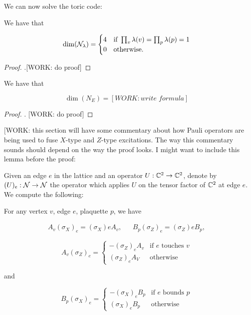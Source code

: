 We can now solve the toric code:

\begin{proposition} We have that

\begin{equation*}
\dim(\mathcal{N}_{\lambda}) = 
\begin{cases}
4 & \text{if }\prod_{v}\lambda(v) = \prod_{p}\lambda(p) = 1\\
0 & \text{otherwise.}
\end{cases}
\end{equation*}

\end{proposition}
\begin{proof}.[WORK: do proof]
\end{proof}

\begin{corollary} We have that

$$\dim (N_{E})=[WORK: write\,\, formula]$$
\end{corollary}
\begin{proof} . [WORK: do proof]
\end{proof}

[WORK: this section will have some commentary about how Pauli operators are being used to fuse $X$-type and $Z$-type excitations. The way this commentary sounds should depend on the way the proof looks. I might want to include this lemma before the proof:

Given an edge $e$ in the lattice and an operator $U:\mathbb{C}^2\to \mathbb{C}^2$, denote by $(U)_e:\mathcal{N}\to\mathcal{N}$ the operator which applies $U$ on the tensor factor of $\mathbb{C}^2$ at edge $e$. We compute the following:

\begin{lemma} For any vertex $v$, edge $e$, plaquette $p$, we have

\begin{align*}
A_v  (\sigma_X)_e=(\sigma_X)e A_v, && B_p (\sigma_Z)_e=(\sigma_Z)e B_p,
\end{align*}

\begin{equation*}
A_v (\sigma_Z)_e=
\begin{cases}
- (\sigma_Z)_e A_v & \text{if $e$ touches $v$}\\
(\sigma_Z)_e A_V & \text{otherwise}
\end{cases}
\end{equation*}

and

\begin{equation*}
B_p (\sigma_X)_e=
\begin{cases}
- (\sigma_X)_e B_p & \text{if $e$ bounds $p$}\\
(\sigma_X)_e B_p & \text{otherwise}
\end{cases}
\end{equation*}


\end{lemma}

